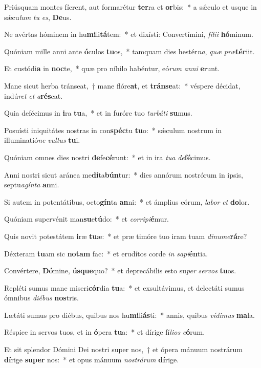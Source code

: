 \item Priúsquam montes fíerent, aut formarétur \textbf{ter}ra et \textbf{or}bis:~* a sǽculo et usque in sǽcu\textit{lum} \textit{tu} \textit{es}, \textbf{De}us.
\item Ne avértas hóminem in hu\textbf{mi}li\textbf{tá}tem:~* et dixísti: Convertímini, \textit{fí}\textit{li}\textit{i} \textbf{hó}minum.
\item Quóniam mille anni ante \textbf{ó}culos \textbf{tu}os,~* tamquam dies hestér\textit{na}, \textit{quæ} \textit{præ}\textbf{tér}iit.
\item Et custódi\textbf{a} in \textbf{noc}te,~* quæ pro níhilo habéntur, eó\textit{rum} \textit{an}\textit{ni} \textbf{e}runt.
\item Mane sicut herba tránseat,~† mane flóre\textbf{at}, et \textbf{tráns}\textbf{e}at:~* véspere décidat, indú\textit{ret} \textit{et} \textit{a}\textbf{rés}cat.
\item Quia defécimus in \textbf{i}ra \textbf{tu}a,~* et in furóre tuo \textit{tur}\textit{bá}\textit{ti} \textbf{su}mus.
\item Posuísti iniquitátes nostras in con\textbf{spéc}tu \textbf{tu}o:~* sǽculum nostrum in illuminatió\textit{ne} \textit{vul}\textit{tus} \textbf{tu}i.
\item Quóniam omnes dies nostri \textbf{de}fe\textbf{cé}runt:~* et in ira \textit{tu}\textit{a} \textit{de}\textbf{fé}cimus.
\item Anni nostri sicut aránea me\textbf{di}ta\textbf{bún}tur:~* dies annórum nostrórum in ipsis, septu\textit{a}\textit{gín}\textit{ta} \textbf{an}ni.
\item Si autem in potentátibus, octo\textbf{gín}ta \textbf{an}ni:~* et ámplius eórum, \textit{la}\textit{bor} \textit{et} \textbf{do}lor.
\item Quóniam supervénit man\textbf{su}e\textbf{tú}do:~* et \textit{cor}\textit{ri}\textit{pi}\textbf{é}mur.
\item Quis novit potestátem \textbf{i}ræ \textbf{tu}æ:~* et præ timóre tuo iram tuam \textit{di}\textit{nu}\textit{me}\textbf{rá}re?
\item Déxteram \textbf{tu}am sic \textbf{no}\textbf{tam} fac:~* et erudítos corde \textit{in} \textit{sa}\textit{pi}\textbf{én}tia.
\item Convértere, \textbf{Dó}mine, \textbf{ús}\textbf{que}quo?~* et deprecábilis esto su\textit{per} \textit{ser}\textit{vos} \textbf{tu}os.
\item Repléti sumus mane miseri\textbf{cór}dia \textbf{tu}a:~* et exsultávimus, et delectáti sumus ómnibus \textit{di}\textit{é}\textit{bus} \textbf{nos}tris.
\item Lætáti sumus pro diébus, quibus nos hu\textbf{mi}li\textbf{ás}ti:~* annis, quibus \textit{ví}\textit{di}\textit{mus} \textbf{ma}la.
\item Réspice in servos tuos, et in \textbf{ó}pera \textbf{tu}a:~* et dírige fí\textit{li}\textit{os} \textit{e}\textbf{ó}rum.
\item Et sit splendor Dómini Dei nostri super nos,~† et ópera mánuum nostrárum \textbf{dí}rige \textbf{su}\textbf{per} nos:~* et opus mánuum \textit{nos}\textit{trá}\textit{rum} \textbf{dí}rige.
